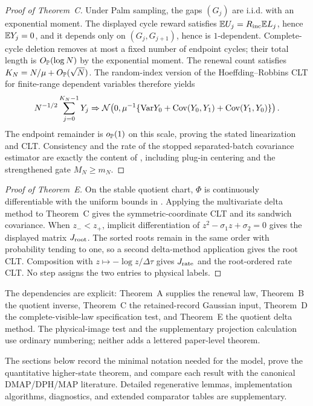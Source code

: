 \begin{proof}[Proof of Theorem~C]
Under Palm sampling, the gaps \((G_j)\) are i.i.d. with an exponential moment.
The displayed cycle reward satisfies \(\mathbb{E} U_j=R_{\mathrm{inc}}\mathbb{E} L_j\), hence
\(\mathbb{E} Y_j=0\), and it depends only on \((G_j,G_{j+1})\), hence is
\(1\)-dependent.  Complete-cycle deletion removes at most a fixed number of
endpoint cycles; their total length is \(O_{\mathbb{P}}(\log N)\) by the exponential
moment.  The renewal count satisfies
\(K_N=N/\mu+O_{\mathbb{P}}(\sqrt N)\).  The random-index version of the
Hoeffding--Robbins CLT for finite-range dependent variables therefore yields
\[
N^{-1/2}\sum_{j=0}^{K_N-1}Y_j
\Rightarrow\mathcal N\!\left(0,
\mu^{-1}\{\mathrm{Var} Y_0+\operatorname{Cov}(Y_0,Y_1)
+\operatorname{Cov}(Y_1,Y_0)\}\right).
\]
The endpoint remainder is \(o_{\mathbb{P}}(1)\) on this scale, proving the stated
linearization and CLT.  Consistency and the rate of the stopped separated-batch
covariance estimator are exactly the content of
, including plug-in centering
and the strengthened gate \(M_N\ge m_N\).
\end{proof}

\begin{proof}[Proof of Theorem~E]
On the stable quotient chart, \(\Phi\) is continuously differentiable with the
uniform bounds in .  Applying the
multivariate delta method to Theorem~C gives the symmetric-coordinate CLT and
its sandwich covariance.  When \(z_-<z_+\), implicit differentiation of
\(z^2-\sigma_1z+\sigma_2=0\) gives the displayed matrix \(J_{\rm root}\).
The sorted roots remain in the same order with probability tending to one, so
a second delta-method application gives the root CLT.  Composition with
\(z\mapsto-\log z/\Delta\tau\) gives \(J_{\rm rate}\) and the root-ordered
rate CLT.  No step assigns the two entries to physical labels.
\end{proof}

The dependencies are explicit: Theorem~A supplies the renewal law, Theorem~B
the quotient inverse, Theorem~C the retained-record Gaussian input,
Theorem~D the complete-visible-law specification test, and Theorem~E the
quotient delta method.  The physical-image test and the supplementary
projection calculation use ordinary numbering; neither adds a lettered
paper-level theorem.

The sections below record the minimal notation needed for the model, prove the
quantitative higher-state theorem, and compare each result with the canonical
DMAP/DPH/MAP literature.  Detailed regenerative lemmas, implementation
algorithms, diagnostics, and extended comparator tables are supplementary.

